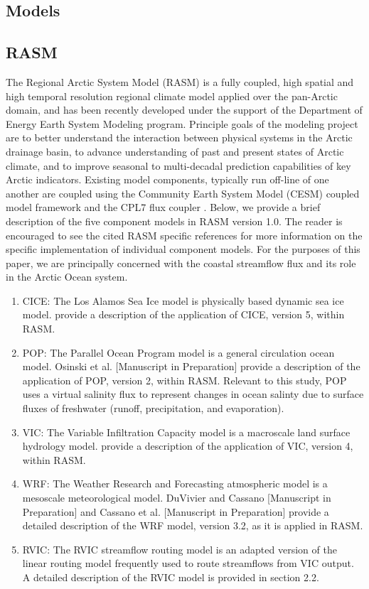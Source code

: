 \documentclass[ms, draft]{agutex}
\begin{document}
\begin{article}
\section{Models}

\subsection{RASM}

The Regional Arctic System Model (RASM) is a fully coupled, high spatial and high temporal resolution regional climate model applied over the pan-Arctic domain, and has been recently developed under the support of the Department of Energy Earth System Modeling program.
Principle goals of the modeling project are to better understand the interaction between physical systems in the Arctic drainage basin, to advance understanding of past and present states of Arctic climate, and to improve seasonal to multi-decadal prediction capabilities of key Arctic indicators.
Existing model components, typically run off-line of one another are coupled using the Community Earth System Model (CESM) coupled model framework and the CPL7 flux coupler \citep{Craig_2011}.
Below, we provide a brief description of the five component models in RASM version 1.0.
The reader is encouraged to see the cited RASM specific references for more information on the specific implementation of individual component models.
For the purposes of this paper, we are principally concerned with the coastal streamflow flux and its role in the Arctic Ocean system.

\begin{enumerate}
\item CICE: The Los Alamos Sea Ice model \citep{Hunke_2010} is physically based dynamic sea ice model.
\citet{Roberts_2015b} provide a description of the application of CICE, version 5, within RASM.
\item POP: The Parallel Ocean Program model \citep{Smith_2010} is a general circulation ocean model.
Osinski et al. [Manuscript in Preparation] provide a description of the application of POP, version 2, within RASM.
Relevant to this study, POP uses a virtual salinity flux to represent changes in ocean salinty due to surface fluxes of freshwater (runoff, precipitation, and evaporation).
\item VIC: The Variable Infiltration Capacity model \citep{Liang_1996} is a macroscale land surface hydrology model.
\citet{Hamman_2015} provide a description of the application of VIC, version 4, within RASM.
\item WRF: The Weather Research and Forecasting atmospheric model \citep{Skamarock_2007} is a mesoscale meteorological model.
DuVivier and Cassano [Manuscript in Preparation] and Cassano et al. [Manuscript in Preparation] provide a detailed description of the WRF model, version 3.2, as it is applied in RASM.
\item RVIC: The RVIC streamflow routing model is an adapted version of the \citet{Lohmann_1996} linear routing model frequently used to route streamflows from VIC output.
A detailed description of the RVIC model is provided in section 2.2.
\end{enumerate}


\end{article}
\end{document}
